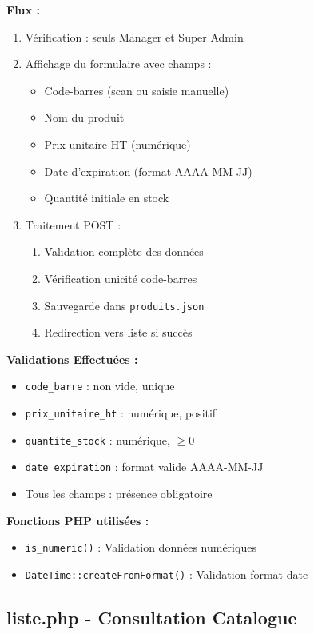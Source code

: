 \documentclass[12pt,a4paper]{report}
\begin{document}
\textbf{Flux :}
\begin{enumerate}
    \item Vérification : seuls Manager et Super Admin
    \item Affichage du formulaire avec champs :
        \begin{itemize}
            \item Code-barres (scan ou saisie manuelle)
            \item Nom du produit
            \item Prix unitaire HT (numérique)
            \item Date d'expiration (format AAAA-MM-JJ)
            \item Quantité initiale en stock
        \end{itemize}
    \item Traitement POST :
        \begin{enumerate}
            \item Validation complète des données
            \item Vérification unicité code-barres
            \item Sauvegarde dans \texttt{produits.json}
            \item Redirection vers liste si succès
        \end{enumerate}
\end{enumerate}

\textbf{Validations Effectuées :}
\begin{itemize}
    \item \texttt{code\_barre} : non vide, unique
    \item \texttt{prix\_unitaire\_ht} : numérique, positif
    \item \texttt{quantite\_stock} : numérique, $\geq 0$
    \item \texttt{date\_expiration} : format valide AAAA-MM-JJ
    \item Tous les champs : présence obligatoire
\end{itemize}

\textbf{Fonctions PHP utilisées :}
\begin{itemize}
    \item \texttt{is\_numeric()} : Validation données numériques
    \item \texttt{DateTime::createFromFormat()} : Validation format date
\end{itemize}

\subsection{liste.php - Consultation Catalogue}
\end{document}
